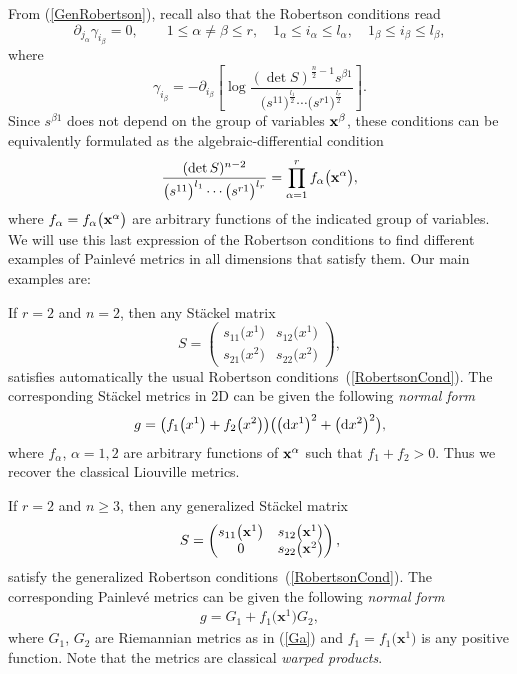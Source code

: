 \documentclass[pdftex]{sigma}
\numberwithin{equation}{section}
\begin{document}
From (\ref{GenRobertson}), recall also that the Robertson conditions read
\[
\partial_{j_{\alpha}}\gamma_{i_{\beta}}=0,\qquad 1\leq \alpha \neq \beta \leq r, \quad 1_{\alpha}\leq i_{\alpha} \leq l_{\alpha},\quad 1_{\beta}\leq i_{\beta} \leq l_{\beta},
\]
where
\[
\gamma_{i_{\beta}}=-\partial_{i_{\beta}}\left[\log \frac{(\det S)^{\frac{n}{2}-1}s^{\beta 1}}{\big(s^{11}\big)^\frac{l_1}{2} \cdots \big(s^{r1}\big)^{\frac{l_r}{2}}}\right].
\]
Since $s^{\beta 1}$ does not depend on the group of variables $\bf{x^\beta}$, these conditions can be equivalently formulated as the algebraic-differential condition
\begin{gather} \label{RobertsonCond}
 \frac{(\det S)^{n-2}}{\big(s^{11}\big)^{l_1} \cdots \big(s^{r1}\big)^{l_r}} = \prod_{\alpha = 1}^r f_\alpha\big(\bf{x^\alpha}\big),
\end{gather}
where $f_\alpha = f_\alpha\big(\bf{x^\alpha}\big)$ are arbitrary functions of the indicated group of variables. We will use this last expression of the Robertson conditions to find different examples of Painlev\'e metrics in all dimensions that satisfy them. Our main examples are:

\begin{Example} \label{Exem0}
If $r = 2$ and $n=2$, then any St\"ackel matrix
\[
S = \left( \begin{matrix}
s_{11}\big( x^1\big) & s_{12}\big(x^1\big) \\
s_{21}\big(x^2\big)&s_{22}\big(x^2\big)
\end{matrix}
\right),
\]
satisfies automatically the usual Robertson conditions~(\ref{RobertsonCond}). The corresponding St\"ackel metrics in 2D can be given the following \emph{normal form}
\begin{gather*} %
 g = \big( f_1\big(x^1\big) + f_2\big(x^2\big) \big) \big( \big({\rm d}x^1\big)^2 + \big({\rm d}x^2\big)^2 \big),
\end{gather*}
where $f_\alpha$, $\alpha=1,2$ are arbitrary functions of ${\bf x}^\alpha$ such that $f_1 + f_2 > 0$. Thus we recover the classical Liouville metrics.

If $r = 2$ and $n \geq 3$, then any generalized St\"ackel matrix
\[
S = \left( \begin{matrix}
s_{11}\big({\bf x}^1\big) & s_{12}\big({\bf x}^1\big) \\
0&s_{22}\big({\bf x}^2\big)
\end{matrix}
\right),
\]
satisfy the generalized Robertson conditions~(\ref{RobertsonCond}). The corresponding Painlev\'e metrics can be given the following \emph{normal form}
\begin{gather*} %
 g = G_1 + f_1\big(\textbf{x}^1\big) G_2,
\end{gather*}
where $G_1$, $G_2$ are Riemannian metrics as in (\ref{Ga}) and $f_1 = f_1\big(\textbf{x}^1\big)$ is any positive function. Note that the metrics are classical \emph{warped products}.
\end{Example}
\end{document}
